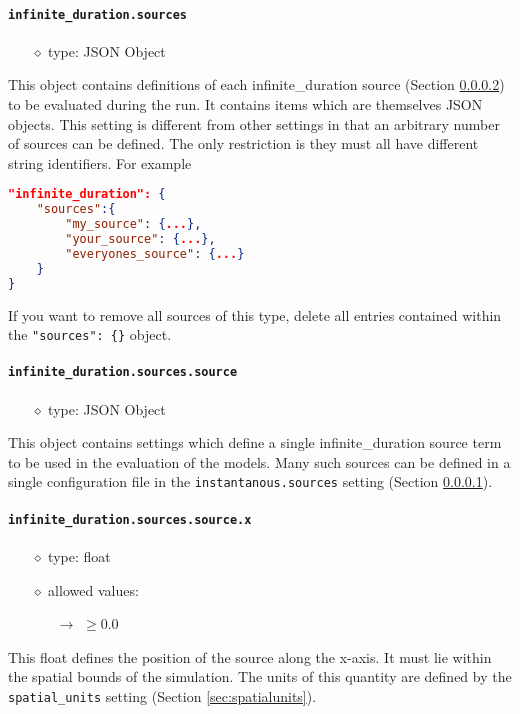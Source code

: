 \documentclass[]{article}
\def\code#1{\texttt{#1}}
\begin{document}
\paragraph{\code{infinite\_duration.sources}}\label{sec:infsources}
\begin{itemize}
    \item[$\diamond$] type: JSON Object 
\end{itemize}
This object contains definitions of each infinite\_duration source (Section
\ref{sec:infsource}) to be evaluated during the run. It contains items which
are themselves JSON objects. This setting is different from other settings in
that an arbitrary number of sources can be defined. The only restriction is they
must all have different string identifiers. For example\\
\begin{lstlisting}[language=json,firstnumber=1]
"infinite_duration": {
    "sources":{
        "my_source": {...},
        "your_source": {...},
        "everyones_source": {...}
    }
}
\end{lstlisting}
\medskip

\noindent If you want to remove all sources of this type, delete all entries
contained within the \code{"sources": \{\}} object.

\paragraph{\code{infinite\_duration.sources.source}}\label{sec:infsource}
\begin{itemize}
    \item[$\diamond$] type: JSON Object 
\end{itemize}
This object contains settings which define a single infinite\_duration source term to
be used in the evaluation of the models. Many such sources can be defined in a
single configuration file in the \code{instantanous.sources} setting (Section
\ref{sec:infsources}).

\paragraph{\code{infinite\_duration.sources.source.x}}\label{sec:infsourcex}
\begin{itemize}
    \item[$\diamond$] type: float 
    \item[$\diamond$] allowed values:
    \begin{itemize}
        \item[$\rightarrow$] $\geq0.0$
    \end{itemize}
\end{itemize}
This float defines the position of the source along the x-axis. It must lie
within the spatial bounds of the simulation. The units of this quantity are
defined by the \code{spatial\_units} setting (Section \ref{sec:spatialunits}).
\end{document}
